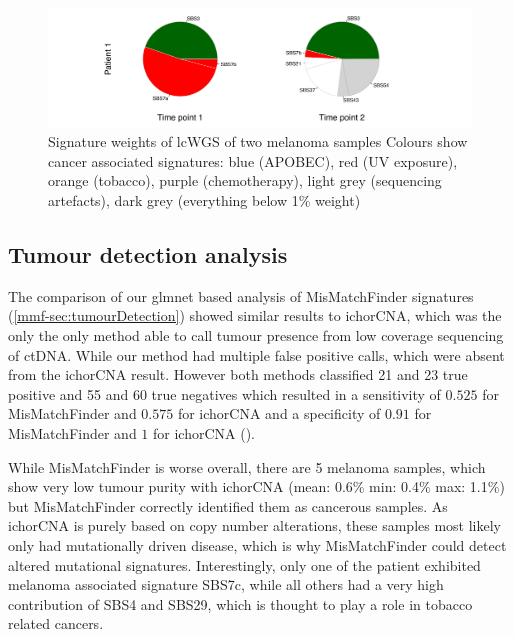 \begin{figure}[ht]
\centering
\includegraphics[width=.99\linewidth]{Figures/MisMatchFinder/melanomaMMFsignatures.pdf}
\caption[Signature weights of lcWGS of two melanoma samples]{Signature weights of lcWGS of two melanoma samples Colours show cancer associated signatures: blue (APOBEC), red (UV exposure), orange (tobacco), purple (chemotherapy), light grey (sequencing artefacts), dark grey (everything below 1\% weight)}\label{fig:mmf-melaMMFsigPie}
\end{figure}


\subsection{ Tumour detection analysis}
\label{mmf-sec:tumourDetection}

The comparison of our glmnet based analysis of MisMatchFinder signatures (\autoref{mmf-sec:tumourDetection}) showed similar results to ichorCNA, which was the only the only method able to call tumour presence from low coverage sequencing of ctDNA. While our method had multiple false positive calls, which were absent from the ichorCNA result. However both methods classified 21 and 23 true positive and 55 and 60 true negatives which resulted in a sensitivity of $0.525$ for MisMatchFinder and $0.575$ for ichorCNA and a specificity of $0.91$ for MisMatchFinder and $1$ for ichorCNA ().

While MisMatchFinder is worse overall, there are 5 melanoma samples, which show very low tumour purity with ichorCNA (mean: 0.6\% min: 0.4\% max: 1.1\%) but MisMatchFinder correctly identified them as cancerous samples. As ichorCNA is purely based on copy number alterations, these samples most likely only had mutationally driven disease, which is why MisMatchFinder could detect altered mutational signatures. Interestingly, only one of the patient exhibited melanoma associated signature SBS7c, while all others had a very high contribution of SBS4 and SBS29, which is thought to play a role in tobacco related cancers. 

